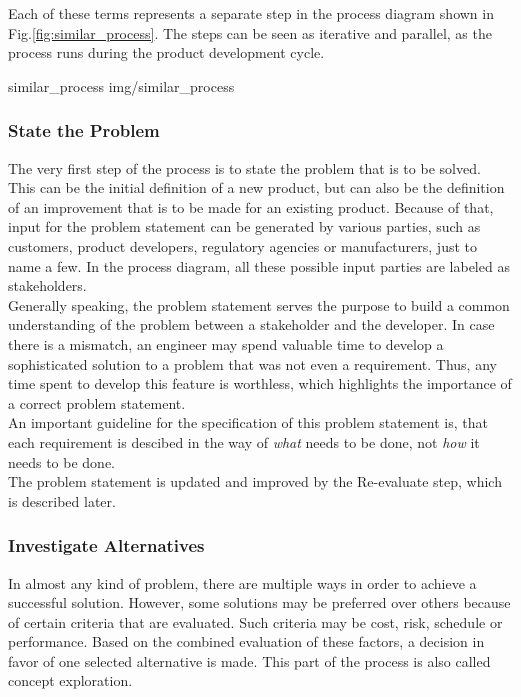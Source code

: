 Each of these terms represents a separate step in the process diagram shown in Fig.\ref{fig:similar_process}.
The steps can be seen as iterative and parallel, as the process runs during the product development cycle.

 {similar_process} {img/similar_process}

\subsubsection{State the Problem}

The very first step of the process is to state the problem that is to be solved.
This can be the initial definition of a new product, but can also be the definition of an improvement that is to be made for an existing product.
Because of that, input for the problem statement can be generated by various parties, such as customers, product developers, regulatory agencies or manufacturers, just to name a few.
In the process diagram, all these possible input parties are labeled as stakeholders.\\

Generally speaking, the problem statement serves the purpose to build a common understanding of the problem between a stakeholder and the developer.
In case there is a mismatch, an engineer may spend valuable time to develop a sophisticated solution to a problem that was not even a requirement.
Thus, any time spent to develop this feature is worthless, which highlights the importance of a correct problem statement.\\

An important guideline for the specification of this problem statement is, that each requirement is descibed in the way of \textit{what} needs to be done, not \textit{how} it needs to be done.\\

The problem statement is updated and improved by the Re-evaluate step, which is described later.

\subsubsection{Investigate Alternatives}

In almost any kind of problem, there are multiple ways in order to achieve a successful solution.
However, some solutions may be preferred over others because of certain criteria that are evaluated.
Such criteria may be cost, risk, schedule or performance.
Based on the combined evaluation of these factors, a decision in favor of one selected alternative is made.
This part of the process is also called concept exploration.\\


